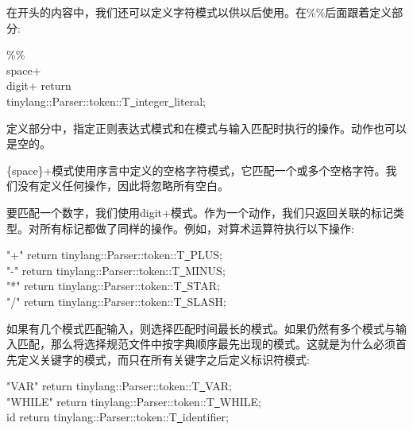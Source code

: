 在开头的内容中，我们还可以定义字符模式以供以后使用。在\%\%后面跟着定义部分:\par

\begin{tcolorbox}[colback=white,colframe=black]
\%\% \\
{space}+ \\
{digit}+ \hspace{1 cm}return \\
\hspace*{3 cm}tinylang::Parser::token::T\underline{~}integer\underline{~}literal;
\end{tcolorbox}

定义部分中，指定正则表达式模式和在模式与输入匹配时执行的操作。动作也可以是空的。\par

\{space\}+模式使用序言中定义的空格字符模式，它匹配一个或多个空格字符。我们没有定义任何操作，因此将忽略所有空白。\par

要匹配一个数字，我们使用{digit}+模式。作为一个动作，我们只返回关联的标记类型。对所有标记都做了同样的操作。例如，对算术运算符执行以下操作:\par

\begin{tcolorbox}[colback=white,colframe=black]
"+" \hspace{2cm}return tinylang::Parser::token::T\underline{~}PLUS; \\
"-" \hspace{2cm}return tinylang::Parser::token::T\underline{~}MINUS; \\
"*" \hspace{2cm}return tinylang::Parser::token::T\underline{~}STAR; \\
"/" \hspace{2cm}return tinylang::Parser::token::T\underline{~}SLASH;	
\end{tcolorbox}

如果有几个模式匹配输入，则选择匹配时间最长的模式。如果仍然有多个模式与输入匹配，那么将选择规范文件中按字典顺序最先出现的模式。这就是为什么必须首先定义关键字的模式，而只在所有关键字之后定义标识符模式:\par

\begin{tcolorbox}[colback=white,colframe=black]
"VAR" \hspace{2cm}return tinylang::Parser::token::T\underline{~}VAR; \\
"WHILE" \hspace{2cm}return tinylang::Parser::token::T\underline{~}WHILE; \\
{id} \hspace{2cm}return tinylang::Parser::token::T\underline{~}identifier;	
\end{tcolorbox}

